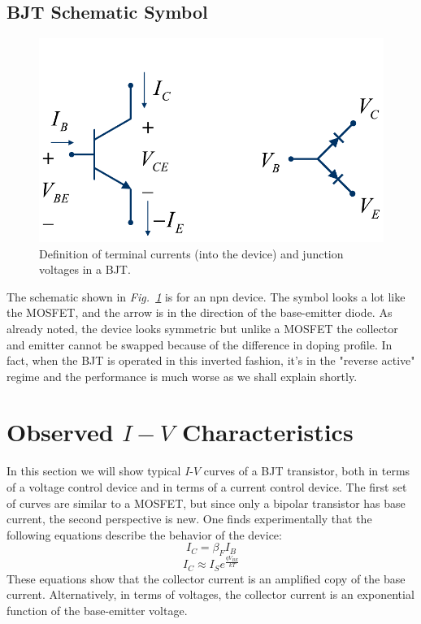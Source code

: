 \subsection{BJT Schematic Symbol}
\begin{figure}[tb]
\centering
\includegraphics[width=.6\columnwidth]{slide5_bjt_schematic}
\caption{Definition of terminal currents (into the device) and junction voltages in a BJT.} \label{fig:slide5_bjt_schematic}
\end{figure}
The schematic shown in \emph{Fig.~\ref{fig:slide5_bjt_schematic}} is for an npn device.  The symbol looks a lot like the MOSFET, and the arrow is in the direction of the base-emitter diode.  As already noted, the device looks symmetric but unlike a MOSFET the collector and emitter cannot be swapped because of the difference in doping profile. In fact, when the BJT is operated in this inverted fashion, it's in the "reverse active" regime and the performance is much worse as we shall explain shortly. 
\section{Observed \texorpdfstring{$I-V$}{I-V} Characteristics}
In this section we will show typical $I$-$V$ curves of a BJT transistor, both in terms of a voltage control device and in terms of a current control device.  The first set of curves are similar to a MOSFET, but since only a bipolar transistor has base current, the second perspective is new.  One finds experimentally that the following equations describe the behavior of the device:
    \begin{equation}
        {I_C} = \beta_F {I_B}
    \end{equation}
    \begin{equation}
        {I_C} \approx {I_S}{e^{\frac{{q{V_{BE}}}}{{kT}}}}
    \end{equation}
These equations show that the collector current is an amplified copy of the base current.  Alternatively, in terms of voltages, the collector current is an exponential function of the base-emitter voltage.
